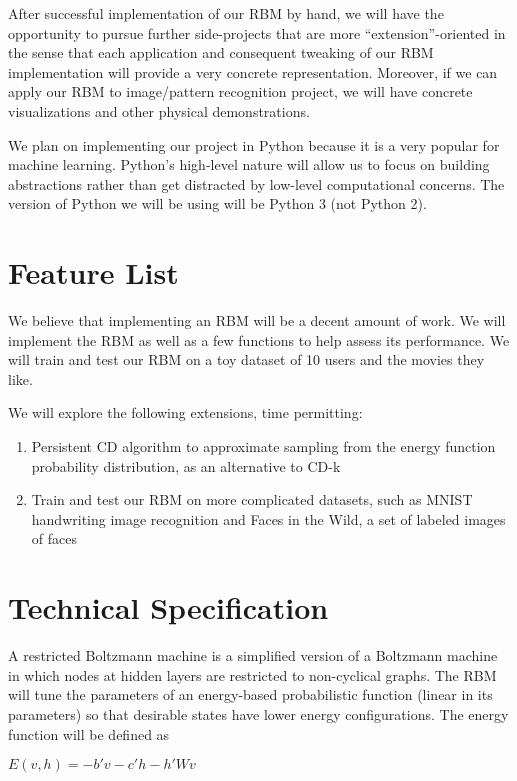 \documentclass[12pt]{article}
\begin{document}
After successful implementation of our RBM by hand, we will have the opportunity to pursue further side-projects that are more ``extension''-oriented in the sense that each application and consequent tweaking of our RBM implementation will provide a very concrete representation. Moreover, if we can apply our RBM to image/pattern recognition project, we will have concrete visualizations and other physical demonstrations. 

We plan on implementing our project in Python because it is a very popular for machine learning. Python's high-level nature will allow us to focus on building abstractions rather than get distracted by low-level computational concerns. The version of Python we will be using will be Python 3 (not Python 2).

\section{Feature List}

We believe that implementing an RBM will be a decent amount of work. We will implement the RBM as well as a few functions to help assess its performance. We will train and test our RBM on a toy dataset of 10 users and the movies they like. 

We will explore the following extensions, time permitting:
\begin{enumerate}
  \item Persistent CD algorithm to approximate sampling from the energy function probability distribution, as an alternative to CD-k
  \item Train and test our RBM on more complicated datasets, such as MNIST handwriting image recognition and Faces in the Wild, a set of labeled images of faces
\end{enumerate}

\section{Technical Specification}

A restricted Boltzmann machine is a simplified version of a Boltzmann machine in which nodes at hidden layers are restricted to non-cyclical graphs. The RBM will tune the parameters of an energy-based probabilistic function (linear in its parameters) so that desirable states have lower energy configurations. The energy function will be defined as 

\begin{center}
$E(v,h) = -b'v - c'h -h'Wv $ 
\end{center}
\end{document}
